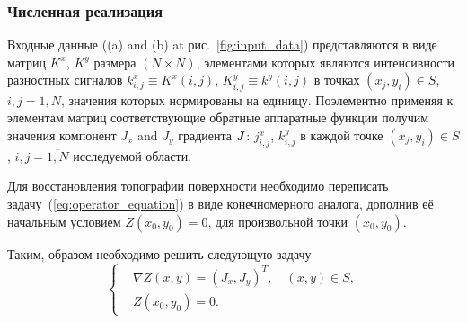 \documentclass{beamer}
\begin{document}
\begin{frame}[c,allowframebreaks]
    \frametitle{Численная реализация}

    Входные данные ((a) and (b) at рис.~\ref{fig:input_data}) представляются в виде матриц
    $K^x$, $K^y$ размера $(N \times N)$, элементами которых являются интенсивности разностных
    сигналов $k^x_{i,j} \equiv K^x (i,j)$, $K^y_{i,j} \equiv k^y (i,j)$
    в точках $(x_j, y_i) \in S$, $i,j = \overline{1,N}$, значения которых нормированы на единицу.
    Поэлементно применяя к элементам матриц соответствующие обратные аппаратные функции получим
    значения компонент $J_x$ and $J_y$ градиента ${\textbf{\emph{J}}}$: $j^x_{i,j}$,
    $k^y_{i,j}$ в каждой точке $(x_j, y_i) \in S$, $i,j = \overline{1,N}$ исследуемой области.

    Для восстановления топографии поверхности необходимо переписать
    задачу~(\ref{eq:operator_equation}) в виде конечномерного аналога, дополнив её начальным
    условием $Z(x_0,y_0) = 0$, для произвольной точки $(x_0, y_0)$.

    \framebreak

    Таким, образом необходимо решить следующую задачу
    \begin{equation}
        \label{system_of_equations}
        \left\{
            \begin{aligned}
                &\nabla Z(x,y) = (J_x, J_y)^T, \quad (x,y)\in S, \\
                &Z(x_0,y_0) = 0.
            \end{aligned}
        \right.
    \end{equation}

    \framebreak


\end{frame}
\end{document}
